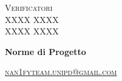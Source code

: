 \documentclass[8pt]{article}
\begin{document}
\begin{titlepage}
\begin{minipage}[t]{0.47\textwidth}
		{\large{\textsc{Verificatori}}
			\vspace{3mm}
			{\\\large{\textsc{XXXX XXXX}\\}} %
			{\large{\textsc{XXXX XXXX}}}
			
		}
		\vspace{4mm}\vspace{4mm}
	\end{minipage}
	\vspace{4cm}
	\begin{center}
		\begin{flushright}
			{\fontsize{30pt}{52pt}\selectfont \textbf{Norme di Progetto\\}} %
		\end{flushright}
		\vspace{3cm}
	\end{center}
	\vspace{9cm}
	{\small \textsc{\href{mailto: nan1fyteam.unipd@gmail.com}{nan1fyteam.unipd@gmail.com}}}
\end{titlepage}
\pagestyle{mystyle}
\end{document}
